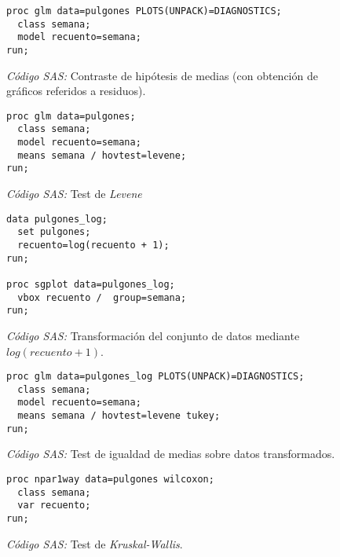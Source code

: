 \documentclass[11pt]{article}
\begin{document}
    \begin{figure}[!h]
      \centering
      \begin{verbatim}
proc glm data=pulgones PLOTS(UNPACK)=DIAGNOSTICS;
  class semana;
  model recuento=semana;
run;
      \end{verbatim}
      \caption{\emph{Código SAS:} Contraste de hipótesis de medias (con obtención de gráficos referidos a residuos).}
      \label{code:sas_5}
    \end{figure}

    \begin{figure}[!h]
      \centering
      \begin{verbatim}
proc glm data=pulgones;
  class semana;
  model recuento=semana;
  means semana / hovtest=levene;
run;
      \end{verbatim}
      \caption{\emph{Código SAS:} Test de \emph{Levene}}
      \label{code:sas_6}
    \end{figure}


    \begin{figure}[!h]
      \centering
      \begin{verbatim}
data pulgones_log;
  set pulgones;
  recuento=log(recuento + 1);
run;

proc sgplot data=pulgones_log;
  vbox recuento /  group=semana;
run;
      \end{verbatim}
      \caption{\emph{Código SAS:} Transformación del conjunto de datos mediante $log(recuento + 1)$.}
      \label{code:sas_7}
    \end{figure}

    \begin{figure}[!h]
      \centering
      \begin{verbatim}
proc glm data=pulgones_log PLOTS(UNPACK)=DIAGNOSTICS;
  class semana;
  model recuento=semana;
  means semana / hovtest=levene tukey;
run;
      \end{verbatim}
      \caption{\emph{Código SAS:} Test de igualdad de medias sobre datos transformados.}
      \label{code:sas_8}
    \end{figure}

    \begin{figure}[!h]
      \centering
      \begin{verbatim}
proc npar1way data=pulgones wilcoxon;
  class semana;
  var recuento;
run;
      \end{verbatim}
      \caption{\emph{Código SAS:} Test de \emph{Kruskal-Wallis}.}
      \label{code:sas_9}
    \end{figure}


  \nocite{rano2017}

  
  
\end{document}
